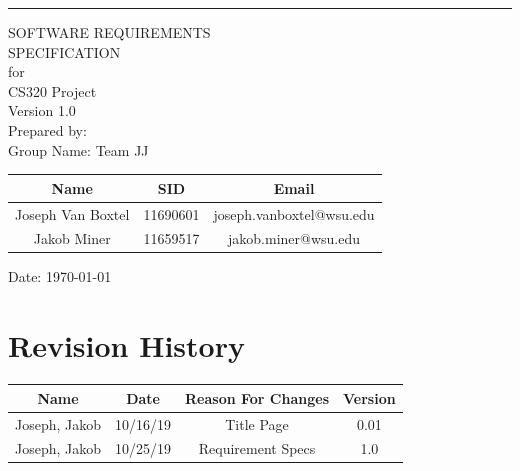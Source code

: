 \documentclass{scrreprt}
\date{}
\def\myversion{1.0 }
\begin{document}
\begin{flushright}
    \begin{bfseries}
        \rule{1\textwidth}{5pt}\vskip1cm

        \Huge{SOFTWARE REQUIREMENTS\\ SPECIFICATION}\\
        \vspace{1.4cm}
        for\\
        \vspace{1.4cm}
       CS320 Project\\
        \vspace{1.4cm}
        \LARGE{Version \myversion}\\
        \vspace{1.4cm}
        Prepared by:\\
        Group Name: Team JJ
        \begin{center}
            \begin{tabular}{|c|c|c|}
                \hline
        	    Name & SID & Email\\
                \hline
        	    Joseph Van Boxtel & 11690601 & joseph.vanboxtel@wsu.edu\\
                \hline
        	    Jakob Miner & 11659517 & jakob.miner@wsu.edu\\
                \hline
            \end{tabular}
        \end{center}

        \vspace{1.9cm}
        Date: \today\\
    \end{bfseries}
\end{flushright}

\tableofcontents


\chapter*{Revision History}

\begin{center}
    \begin{tabular}{|c|c|c|c|}
        \hline
	    Name & Date & Reason For Changes & Version\\
        \hline
	    Joseph, Jakob & 10/16/19 & Title Page & 0.01\\
	    \hline
	    Joseph, Jakob & 10/25/19 & Requirement Specs & 1.0\\
        \hline
    \end{tabular}
\end{center}
\end{document}
